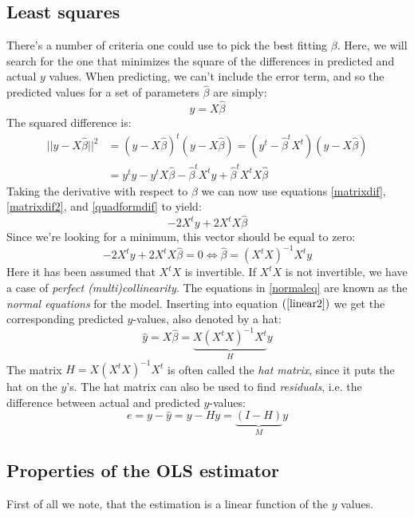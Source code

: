 \documentclass[12pt, a4paper]{article}
\numberwithin{equation}{section}
\begin{document}
\subsection{Least squares}
There's a number of criteria one could use to pick the best fitting $\beta$. Here, we will search for the one that minimizes the square of the differences in predicted and actual $y$ values. When predicting, we can't include the error term, and so the predicted values for a set of parameters $\hat{\beta}$ are simply:
\begin{equation}
y=X\hat{\beta}
\end{equation}
The squared difference is:
\begin{align*}
||y-X\hat{\beta}||^2 &=(y-X\hat{\beta})^t(y-X\hat{\beta})=(y^t-\hat{\beta}^t X^t)(y-X\hat{\beta})\\
&=y^t y - y^t X\hat{\beta} - \hat{\beta}^t X^t y + \hat{\beta}^t X^t X\hat{\beta}
\end{align*}
Taking the derivative with respect to $\beta$ we can now use equations \ref{matrixdif}, \ref{matrixdif2}, and \ref{quadformdif} to yield:
\begin{equation}
-2X^t y + 2X^t X\hat{\beta}
\end{equation}
Since we're looking for a minimum, this vector should be equal to zero:
\begin{equation}
\label{normaleq}
-2X^t y + 2X^t X\hat{\beta}=0\Leftrightarrow\hat{\beta}=(X^t X)^{-1}X^t y
\end{equation}
Here it has been assumed that $X^t X$ is invertible. If $X^t X$ is not invertible, we have a case of \textit{perfect (multi)collinearity}. The equations in \ref{normaleq} are known as the \textit{normal equations} for the model. Inserting into equation $(\ref{linear2})$ we get the corresponding predicted $y$-values, also denoted by a hat:
\begin{equation}
\hat{y}=X\hat{\beta}=\underbrace{X(X^t X)^{-1}X^t}_{H}y
\end{equation}
The matrix $H=X(X^t X)^{-1}X^t$ is often called the \textit{hat matrix}, since it puts the hat on the $y$'s. The hat matrix can also be used to find \textit{residuals}, i.e. the difference between actual and predicted $y$-values:
\begin{equation}
e=y-\hat{y}=y-Hy=\underbrace{(I-H)}_{M} y
\end{equation}

\subsection{Properties of the OLS estimator}
First of all we note, that the estimation is a linear function of the $y$ values.
\end{document}
